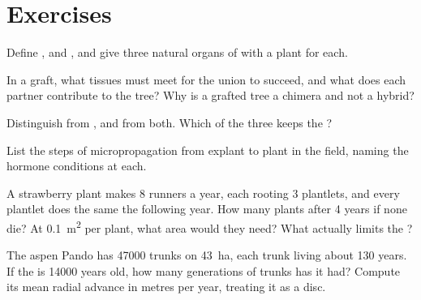 \section{Exercises}

\begin{exercise}[$\star$]\label{exo:b2:asexual-reproduction:1}
Define ,  and , and give three natural organs of
 with a plant for each.
\end{exercise}

\begin{exercise}[$\star$]\label{exo:b2:asexual-reproduction:2}
In a graft, what tissues must meet for the union to succeed, and
what does each partner contribute to the tree? Why is a grafted
tree a chimera and not a hybrid?
\end{exercise}

\begin{exercise}[$\star$]\label{exo:b2:asexual-reproduction:3}
Distinguish  from , and
 from both. Which of the three keeps the ?
\end{exercise}

\begin{exercise}[$\star$]\label{exo:b2:asexual-reproduction:4}
List the steps of micropropagation from explant to plant in the
field, naming the hormone conditions at each.
\end{exercise}

\begin{exercise}[$\star\star$]\label{exo:b2:asexual-reproduction:5}
A strawberry plant makes 8 runners a year, each rooting 3
plantlets, and every plantlet does the same the following year.
How many plants after 4 years if none die? At \qty{0.1}{m^2} per
plant, what area would they need? What actually limits the ?
\end{exercise}

\begin{exercise}[$\star\star$]\label{exo:b2:asexual-reproduction:6}
The aspen  Pando has \num{47000} trunks on \qty{43}{ha}, each
trunk living about \num{130} years. If the  is \num{14000} years
old, how many generations of trunks has it had? Compute its mean
radial advance in metres per year, treating it as a disc.
\end{exercise}

